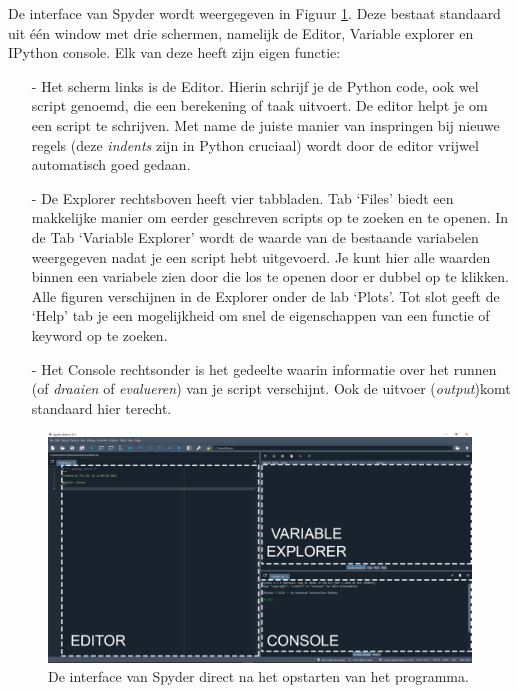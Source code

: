 \documentclass[a4paper,11pt, fleqn]{article}
\begin{document}
De interface van Spyder wordt weergegeven in Figuur \ref{fig-spyder}. Deze bestaat standaard uit \'e\'en window met drie schermen, namelijk de Editor, Variable explorer en IPython console. Elk van deze heeft zijn eigen functie:
\begin{itemize}
\item[-] Het scherm links is de Editor. Hierin schrijf je de Python code, ook wel script genoemd, die een berekening of taak uitvoert. De editor helpt je om een script te schrijven. Met name de juiste manier van inspringen bij nieuwe regels (deze \textit{indents} zijn in Python cruciaal) wordt door de editor vrijwel automatisch goed gedaan.
\item[-] De Explorer rechtsboven heeft vier tabbladen. Tab `Files' biedt een makkelijke manier om eerder geschreven scripts op te zoeken en te openen. In de Tab `Variable Explorer' wordt de waarde van de bestaande variabelen weergegeven nadat je een script hebt uitgevoerd. Je kunt hier alle waarden binnen een variabele zien door die los te openen door er dubbel op te klikken. Alle figuren verschijnen in de Explorer onder de lab `Plots'. Tot slot geeft de `Help' tab je een mogelijkheid om snel de eigenschappen van een functie of keyword op te zoeken.
\item[-]Het Console rechtsonder is het gedeelte waarin informatie over het runnen (of \textit{draaien} of \textit{evalueren}) van je script verschijnt. Ook de uitvoer (\textit{output})komt standaard hier terecht.
\end{itemize}

\begin{figure}[h]
\includegraphics[width=16cm]{fig/spyder_screenshot.png}
\caption{De interface van Spyder direct na het opstarten van het programma.}
\label{fig-spyder}
\end{figure}
\end{document}
